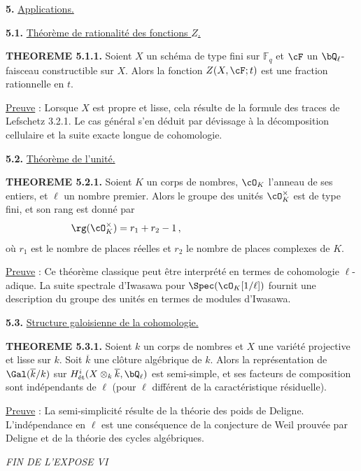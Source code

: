 \bigskip

\noindent
\textbf{5.} \underline{Applications.}

\noindent
\textbf{5.1.} \underline{Th\'eor\`eme de rationalit\'e des fonctions $Z$.}

\noindent
\textbf{THEOREME 5.1.1.} Soient $X$ un sch\'ema de type fini sur $\mathbb{F}_q$ et $\cF$ un $\bQ_{\ell}$-faisceau constructible sur $X$. Alors la fonction $Z(X, \cF; t)$ est une fraction rationnelle en $t$.

\smallskip

\noindent
\underline{Preuve} : Lorsque $X$ est propre et lisse, cela r\'esulte de la formule des traces de Lefschetz 3.2.1. Le cas g\'en\'eral s'en d\'eduit par d\'evissage \`a la d\'ecomposition cellulaire et la suite exacte longue de cohomologie.

\bigskip

\noindent
\textbf{5.2.} \underline{Th\'eor\`eme de l'unit\'e.}

\noindent
\textbf{THEOREME 5.2.1.} Soient $K$ un corps de nombres, $\cO_K$ l'anneau de ses entiers, et $\ell$ un nombre premier. Alors le groupe des unit\'es $\cO_K^{\times}$ est de type fini, et son rang est donn\'e par
\[
\rg(\cO_K^{\times}) = r_1 + r_2 - 1\,,\hspace*{4cm}
\]
o\`u $r_1$ est le nombre de places r\'eelles et $r_2$ le nombre de places complexes de $K$.

\smallskip

\noindent
\underline{Preuve} : Ce th\'eor\`eme classique peut \^etre interpr\'et\'e en termes de cohomologie $\ell$-adique. La suite spectrale d'Iwasawa pour $\Spec(\cO_K[1/\ell])$ fournit une description du groupe des unit\'es en termes de modules d'Iwasawa.

\bigskip

\noindent
\textbf{5.3.} \underline{Structure galoisienne de la cohomologie.}

\noindent
\textbf{THEOREME 5.3.1.} Soient $k$ un corps de nombres et $X$ une vari\'et\'e projective et lisse sur $k$. Soit $\overline{k}$ une cl\^oture alg\'ebrique de $k$. Alors la repr\'esentation de $\Gal(\overline{k}/k)$ sur $H^i_{\text{\'et}}(X \otimes_k \overline{k}, \bQ_{\ell})$ est semi-simple, et ses facteurs de composition sont ind\'ependants de $\ell$ (pour $\ell$ diff\'erent de la caract\'eristique r\'esiduelle).

\smallskip

\noindent
\underline{Preuve} : La semi-simplicit\'e r\'esulte de la th\'eorie des poids de Deligne. L'ind\'ependance en $\ell$ est une cons\'equence de la conjecture de Weil prouv\'ee par Deligne et de la th\'eorie des cycles alg\'ebriques.

\newpage

\begin{center}
\textit{FIN DE L'EXPOSE VI}
\end{center}
